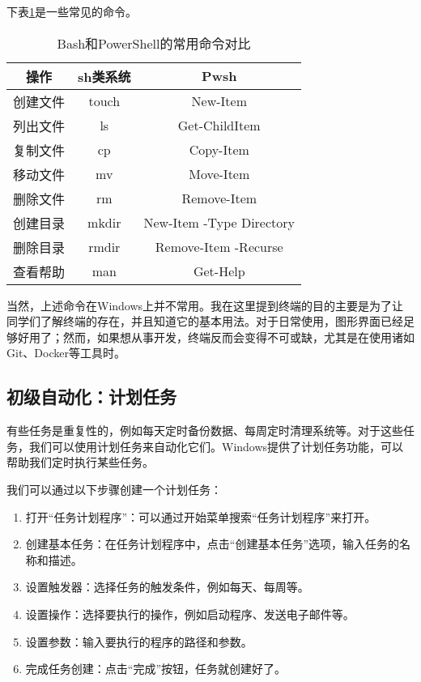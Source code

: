 \documentclass[../main.tex]{subfiles}
\begin{document}
下表\ref{tab:terminal-commands}是一些常见的命令。

\begin{table}[ht]
  \centering
  \begin{tabular}{c|cc}
    \hline
    \textbf{操作} & \textbf{\*sh类系统} & \textbf{Pwsh} \\
    \hline
    创建文件 & touch & New-Item \\
    列出文件 & ls & Get-ChildItem \\
    复制文件 & cp & Copy-Item \\
    移动文件 & mv & Move-Item \\
    删除文件 & rm & Remove-Item \\
    创建目录 & mkdir & New-Item -Type Directory \\
    删除目录 & rmdir & Remove-Item -Recurse \\
    查看帮助 & man & Get-Help \\
    \hline
  \end{tabular}
  \caption{Bash和PowerShell的常用命令对比}
  \label{tab:terminal-commands}
\end{table}

当然，上述命令在Windows上并不常用。我在这里提到终端的目的主要是为了让同学们了解终端的存在，并且知道它的基本用法。对于日常使用，图形界面已经足够好用了；然而，如果想从事开发，终端反而会变得不可或缺，尤其是在使用诸如Git、Docker等工具时。

\subsection{初级自动化：计划任务}

有些任务是重复性的，例如每天定时备份数据、每周定时清理系统等。对于这些任务，我们可以使用计划任务来自动化它们。Windows提供了计划任务功能，可以帮助我们定时执行某些任务。

我们可以通过以下步骤创建一个计划任务：
\begin{enumerate}
  \item 打开“任务计划程序”：可以通过开始菜单搜索“任务计划程序”来打开。
  \item 创建基本任务：在任务计划程序中，点击“创建基本任务”选项，输入任务的名称和描述。
  \item 设置触发器：选择任务的触发条件，例如每天、每周等。
  \item 设置操作：选择要执行的操作，例如启动程序、发送电子邮件等。
  \item 设置参数：输入要执行的程序的路径和参数。
  \item 完成任务创建：点击“完成”按钮，任务就创建好了。
\end{enumerate}
\end{document}
